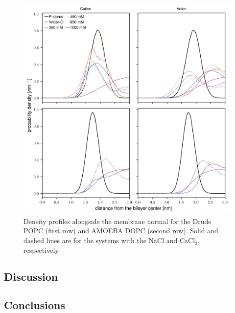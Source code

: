 \documentclass[journal=jacsat,manuscript=article,layout=singlecolumn]{achemso}
\begin{document}
\begin{figure}[!hbt]
    \centering
    \includegraphics{Figures/ion_density_profiles_with_chloride.png}
    \caption{Density profiles alongside the membrane normal for the Drude POPC (first row) and AMOEBA DOPC (second row). Solid and dashed lines are for the systems with the NaCl and CaCl$_{2}$, respectively.}
    \label{fig:ion_density_profiles}
\end{figure}


\clearpage

\subsection{Discussion}

\subsection{Conclusions}

\begin{acknowledgement}


\end{acknowledgement}
\end{document}
